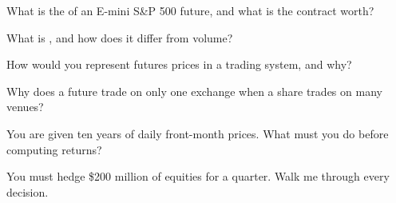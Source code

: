 \begin{interviewq}\label{iq:m1:futures-contracts-and-exchanges:1}
What is the  of an E-mini S\&P 500 future, and what is the
contract worth?
\end{interviewq}

\begin{interviewq}\label{iq:m1:futures-contracts-and-exchanges:2}
What is , and how does it differ from volume?
\end{interviewq}

\begin{interviewq}\label{iq:m1:futures-contracts-and-exchanges:3}
How would you represent futures prices in a trading system, and why?
\end{interviewq}

\begin{interviewq}\label{iq:m1:futures-contracts-and-exchanges:4}
Why does a future trade on only one exchange when a share trades on many
venues?
\end{interviewq}

\begin{interviewq}\label{iq:m1:futures-contracts-and-exchanges:5}
You are given ten years of daily front-month prices. What must you do before
computing returns?
\end{interviewq}

\begin{interviewq}\label{iq:m1:futures-contracts-and-exchanges:6}
You must hedge \$200 million of equities for a quarter. Walk me through every
decision.
\end{interviewq}
